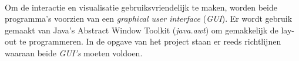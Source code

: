 
\\


\noindent
Om de interactie en visualisatie gebruiksvriendelijk te maken, worden beide programma's voorzien van een \textit{graphical user interface} (\textit{GUI}). Er wordt gebruik gemaakt van Java's Abstract Window Toolkit (\textit{java.awt}) om gemakkelijk de lay-out te programmeren. In de opgave van het project \cite{arcticle:opgavePeno} staan er reeds richtlijnen waaraan beide \textit{GUI's} moeten voldoen. 